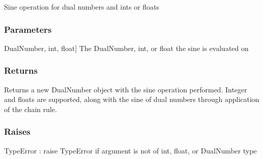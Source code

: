 \documentclass[letterpaper,10pt,english]{sphinxmanual}
\begin{document}
\begin{fulllineitems}
\label{\detokenize{autodiff:autodiff.operators.sin}}
\pysigstartsignatures
{}
\pysigstopsignatures
\sphinxAtStartPar
Sine operation for dual numbers and ints or floats


\subsubsection{Parameters}
\label{\detokenize{autodiff:id33}}\begin{description}
\sphinxlineitem{x}{[}DualNumber, int, float{]}
\sphinxAtStartPar
The DualNumber, int, or float the sine is evaluated on

\end{description}


\subsubsection{Returns}
\label{\detokenize{autodiff:id34}}\begin{description}
\sphinxAtStartPar
Returns a new DualNumber object with the sine operation performed. Integer and
floats are supported, along with the sine of dual numbers through application 
of the chain rule.

\end{description}


\subsubsection{Raises}
\label{\detokenize{autodiff:id35}}
\sphinxAtStartPar
TypeError : raise TypeError if argument is not of int, float, or DualNumber type

\end{fulllineitems}

\end{document}
